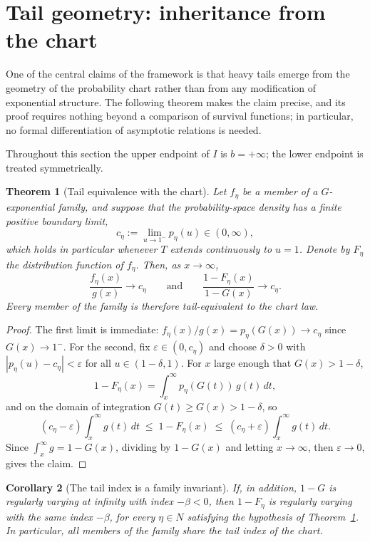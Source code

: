 \documentclass[11pt]{article}
\newtheorem{theorem}{Theorem}[section]
\newtheorem{corollary}[theorem]{Corollary}
\theoremstyle{definition}
\begin{document}
\section{Tail geometry: inheritance from the chart}\label{sec:tails}

One of the central claims of the framework is that heavy tails emerge from
the geometry of the probability chart rather than from any modification of
exponential structure. The following theorem makes the claim precise, and
its proof requires nothing beyond a comparison of survival functions; in
particular, no formal differentiation of asymptotic relations is needed.

Throughout this section the upper endpoint of $I$ is $b=+\infty$; the
lower endpoint is treated symmetrically.

\begin{theorem}[Tail equivalence with the chart]\label{thm:tail-equivalence}
Let $f_\eta$ be a member of a $G$-exponential family, and suppose that the
probability-space density has a finite positive boundary limit,
\[
c_\eta:=\lim_{u\to1^-}p_\eta(u)\in(0,\infty),
\]
which holds in particular whenever $T$ extends continuously to $u=1$.
Denote by $F_\eta$ the distribution function of $f_\eta$. Then, as
$x\to\infty$,
\[
\frac{f_\eta(x)}{g(x)}\longrightarrow c_\eta
\qquad\text{and}\qquad
\frac{1-F_\eta(x)}{1-G(x)}\longrightarrow c_\eta .
\]
Every member of the family is therefore tail-equivalent to the chart law.
\end{theorem}

\begin{proof}
The first limit is immediate: $f_\eta(x)/g(x)=p_\eta(G(x))\to c_\eta$
since $G(x)\to1^-$. For the second, fix $\varepsilon\in(0,c_\eta)$ and
choose $\delta>0$ with $|p_\eta(u)-c_\eta|<\varepsilon$ for all
$u\in(1-\delta,1)$. For $x$ large enough that $G(x)>1-\delta$,
\[
1-F_\eta(x)=\int_x^\infty p_\eta(G(t))\,g(t)\,dt,
\]
and on the domain of integration $G(t)\ge G(x)>1-\delta$, so
\[
(c_\eta-\varepsilon)\int_x^\infty g(t)\,dt
\;\le\;
1-F_\eta(x)
\;\le\;
(c_\eta+\varepsilon)\int_x^\infty g(t)\,dt .
\]
Since $\int_x^\infty g=1-G(x)$, dividing by $1-G(x)$ and letting
$x\to\infty$, then $\varepsilon\to0$, gives the claim.
\end{proof}

\begin{corollary}[The tail index is a family invariant]\label{cor:rv}
If, in addition, $1-G$ is regularly varying at infinity with index
$-\beta<0$, then $1-F_\eta$ is regularly varying with the same index
$-\beta$, for every $\eta\in N$ satisfying the hypothesis of
Theorem~\ref{thm:tail-equivalence}. In particular, all members of the
family share the tail index of the chart.
\end{corollary}
\end{document}
